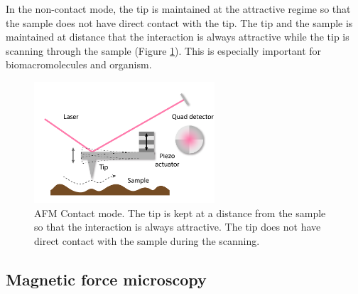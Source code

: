 \documentclass[pdflatex, sectionletters, 12pt]{pittetd}    %
\begin{document}
In the non-contact mode, the tip is maintained at the attractive regime so that the sample does not have direct contact with the tip. The tip and the sample is maintained at distance that the interaction is always attractive while the tip is scanning through the sample (Figure \ref{FIG:NonContactAFM}). This is especially important for biomacromolecules and organism. 

\begin{figure}[h!]
	\centering
	\includegraphics[width=0.6\textwidth]{Drawing/NonContactAFM.pdf}
	\caption{AFM Contact mode. The tip is kept at a distance from the sample so that the interaction is always attractive. The tip does not have direct contact with the sample during the scanning.}
	\label{FIG:NonContactAFM}
\end{figure}

\subsection{Magnetic force microscopy}
\label{SEC:AFMMFM}
\end{document}
